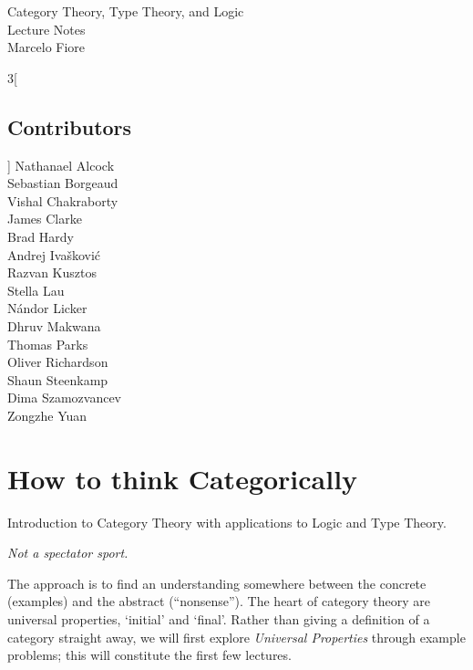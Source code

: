 \newcommand{\phold}{\text{--}}
\newcommand{\Phold}{\text{=}}

\newcommand{\op}{\mathrm{op}}



\begin{center} {\LARGE \sc
Category Theory, Type Theory, and Logic\\
  Lecture Notes\\[4mm]}
  \Large Marcelo Fiore
\end{center}


\thispagestyle{plain}
\begin{multicols}{3}[\section*{Contributors}]
Nathanael Alcock\\
Sebastian Borgeaud\\
Vishal Chakraborty\\
James Clarke\\
Brad Hardy\\
Andrej Ivašković\\
Razvan Kusztos\\
Stella Lau\\
Nándor Licker\\
Dhruv Makwana\\
Thomas Parks\\
Oliver Richardson\\
Shaun Steenkamp\\
Dima Szamozvancev\\
Zongzhe Yuan\\
\end{multicols}
\clearpage


\tableofcontents

\newpage

\chapter{How to think Categorically}

Introduction to Category Theory with applications to Logic and Type Theory.

\emph{Not a spectator sport.}

The approach is to find an understanding somewhere between the concrete
(examples) and the abstract (``nonsense''). The heart of category theory are
universal properties, `initial' and `final'.
Rather than giving a definition of a category straight away, we will first
explore \emph{Universal Properties} through example problems; this will
constitute the first few lectures.

